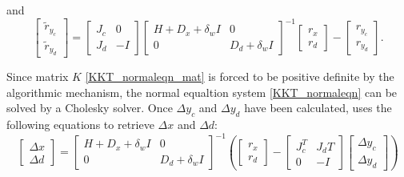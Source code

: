 and
\begin{equation} \label{KKT_normaleqn_rhs}
  \begin{bmatrix} \tilde{r}_{y_c} \\ \tilde{r}_{y_d}\end{bmatrix}
  = 
  \begin{bmatrix}
    J_c & 0 \\
    J_d & -I 
  \end{bmatrix} 
  \begin{bmatrix}
    H+D_x+\delta_{w}I & 0 \\
    0  & D_d + \delta_{w}I
  \end{bmatrix}^{-1}
  \begin{bmatrix} {r}_{x} \\ {r}_{d}\end{bmatrix}
  -
  \begin{bmatrix} r_{y_c} \\ r_{y_d}\end{bmatrix}.
\end{equation}

Since matrix $K$ \eqref{KKT_normaleqn_mat} is forced to be positive definite by the algorithmic mechanism, the normal equaltion system \eqref{KKT_normaleqn} can be solved by a Cholesky solver. Once $\Delta y_c$ and $\Delta y_d$ have been calculated, \Hi uses the following equations to retrieve $\Delta x$ and $\Delta d$: 
\begin{equation} \label{KKT_normaleqn_step_xd}
  \begin{bmatrix} \Delta x \\ \Delta d  \end{bmatrix} 
  = 
  \begin{bmatrix}
    H+D_x+\delta_{w}I & 0 \\
    0  & D_d + \delta_{w}I
  \end{bmatrix}^{-1}
  ( \begin{bmatrix} {r}_{x} \\ {r}_{d}\end{bmatrix}
    -
    \begin{bmatrix}
      J_c^{T} & J_d{T} \\
      0 & -I 
    \end{bmatrix}
    \begin{bmatrix} \Delta y_c \\ \Delta y_d  \end{bmatrix} 
  )
\end{equation}





